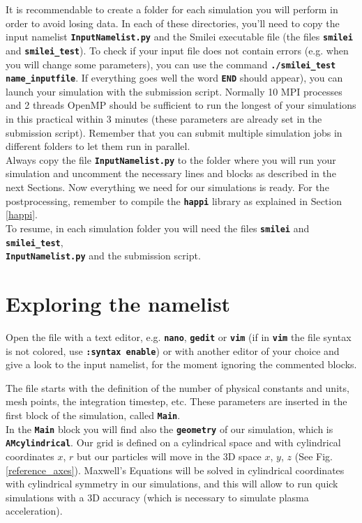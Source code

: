 \documentclass{article}
\newcommand{\smilei}{{\sc Smilei}\xspace}
\newcommand{\commandline}[1]{\texttt{\textbf{#1}}}
\begin{document}
It is recommendable to create a folder for each simulation you will perform in order to avoid losing data. In each of these directories, you'll need to copy the input namelist \commandline{InputNamelist.py} and the \smilei executable file (the files \commandline{smilei} and \commandline{smilei\_test}). To check if your input file does not contain errors (e.g. when you will change some parameters), you can use the command \commandline{./smilei\_test name\_inputfile}. If everything goes well the word \commandline{END} should appear), you can launch your simulation with the submission script. Normally 10 MPI processes and 2 threads OpenMP should be sufficient to run the longest of your simulations in this practical within 3 minutes (these parameters are already set in the submission script). Remember that you can submit multiple simulation jobs in different folders to let them run in parallel.\\

Always copy the file \commandline{InputNamelist.py} to the folder where you will run your simulation and uncomment the necessary lines and blocks as described in the next Sections. Now everything we need for our simulations is ready. For the postprocessing, remember to compile the \commandline{happi} library as explained in Section \ref{happi}.\\

To resume, in each simulation folder you will need the files \commandline{smilei} and \commandline{smilei\_test},\\ \commandline{InputNamelist.py} and the submission script.

\newpage 

\section{Exploring the namelist}
Open the file with a text editor, e.g. \commandline{nano}, \commandline{gedit} or \commandline{vim} (if in \commandline{vim} the file syntax is not colored, use \commandline{:syntax enable}) or with another editor of your choice and give a look to the input namelist, for the moment ignoring the commented blocks. 

The file starts with the definition of the number of physical constants and units, mesh points, the integration timestep, etc. These parameters are inserted in the first block of the simulation, called \commandline{Main}.\\

In the  \commandline{Main} block you will find also the  \commandline{geometry} of our simulation, which is \commandline{AMcylindrical}. Our grid is  defined on a cylindrical space and with cylindrical coordinates $x$, $r$ but our  particles will move in the 3D  space $x$, $y$, $z$ (See Fig. \ref{reference_axes}). Maxwell's Equations will be solved in cylindrical coordinates with cylindrical symmetry in our simulations, and this will allow to run quick simulations with a 3D accuracy (which  is necessary to simulate plasma acceleration).\\
\end{document}
